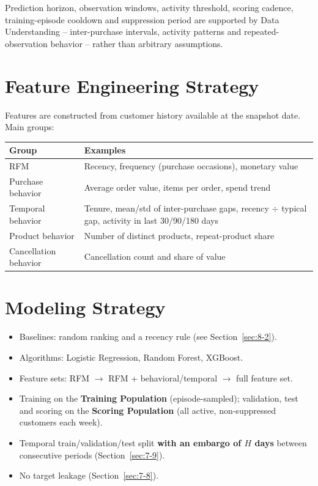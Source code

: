 Prediction horizon, observation windows, activity threshold, scoring cadence, training-episode cooldown and suppression period are supported by Data Understanding -- inter-purchase intervals, activity patterns and repeated-observation behavior -- rather than arbitrary assumptions.

\section{Feature Engineering Strategy}
\label{sec:3-11}

Features are constructed from customer history available at the snapshot date. Main groups:

\begin{center}
\begin{tabular}{@{}p{3.6cm}p{10.6cm}@{}}
    \toprule
    Group & Examples \\
    \midrule
    RFM & Recency, frequency (purchase occasions), monetary value \\
    Purchase behavior & Average order value, items per order, spend trend \\
    Temporal behavior & Tenure, mean/std of inter-purchase gaps, recency $\div$ typical gap, activity in last 30/90/180 days \\
    Product behavior & Number of distinct products, repeat-product share \\
    Cancellation behavior & Cancellation count and share of value \\
    \bottomrule
\end{tabular}
\end{center}

\section{Modeling Strategy}
\label{sec:3-12}

\begin{itemize}
    \item Baselines: random ranking and a recency rule (see Section~\ref{sec:8-2}).
    \item Algorithms: Logistic Regression, Random Forest, XGBoost.
    \item Feature sets: RFM $\rightarrow$ RFM + behavioral/temporal $\rightarrow$ full feature set.
    \item Training on the \textbf{Training Population} (episode-sampled); validation, test and scoring on the \textbf{Scoring Population} (all active, non-suppressed customers each week).
    \item Temporal train/validation/test split \textbf{with an embargo of $H$ days} between consecutive periods (Section~\ref{sec:7-9}).
    \item No target leakage (Section~\ref{sec:7-8}).
\end{itemize}

